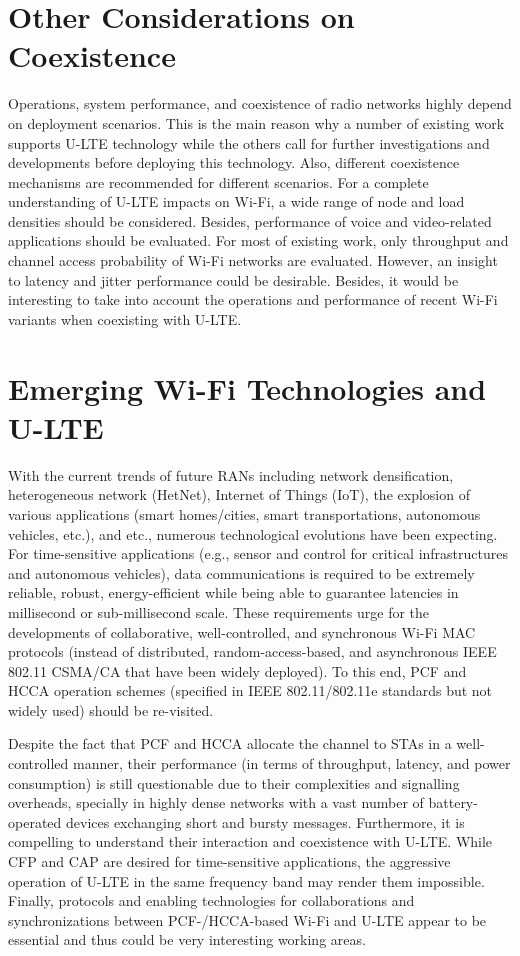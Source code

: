 \section{Other Considerations on Coexistence}
Operations, system performance, and coexistence of radio networks highly depend on deployment scenarios. This is the main reason why a number of existing work supports \mbox{U-LTE} technology while the others call for further investigations and developments before deploying this technology. Also, different coexistence mechanisms are recommended for different scenarios. For a complete understanding of \mbox{U-LTE} impacts on \mbox{Wi-Fi}, a wide range of node and load densities should be considered. Besides, performance of voice and video-related applications should be evaluated. For most of existing work, only throughput and channel access probability of \mbox{Wi-Fi} networks are evaluated. However, an insight to latency and jitter performance could be desirable. Besides, it would be interesting to take into account the operations and performance of recent \mbox{Wi-Fi} variants when coexisting with \mbox{U-LTE}.

\section{Emerging Wi-Fi Technologies and U-LTE}
With the current trends of future RANs including network densification, heterogeneous network (HetNet), Internet of Things (IoT), the explosion of various applications (smart homes/cities, smart transportations, autonomous vehicles, etc.), and etc., numerous technological evolutions have been expecting. For time-sensitive applications (e.g., sensor and control for critical infrastructures and autonomous vehicles), data communications is required to be extremely reliable, robust, energy-efficient while being able to guarantee latencies in millisecond or sub-millisecond scale. These requirements urge for the developments of collaborative, well-controlled, and synchronous \mbox{Wi-Fi} MAC protocols (instead of distributed, random-access-based, and asynchronous IEEE 802.11 CSMA/CA that have been widely deployed). To this end, PCF and HCCA operation schemes (specified in IEEE 802.11/802.11e standards but not widely used) should be re-visited.

Despite the fact that PCF and HCCA allocate the channel to STAs in a well-controlled manner, their performance (in terms of throughput, latency, and power consumption) is still questionable due to their complexities and signalling overheads, specially in highly dense networks with a vast number of battery-operated devices exchanging short and bursty messages. Furthermore, it is compelling to understand their interaction and coexistence with \mbox{U-LTE}. While CFP and CAP are desired for time-sensitive applications, the aggressive operation of \mbox{U-LTE} in the same frequency band may render them impossible. Finally, protocols and enabling technologies for collaborations and synchronizations between PCF-/HCCA-based \mbox{Wi-Fi} and \mbox{U-LTE} appear to be essential and thus could be very interesting working areas.

